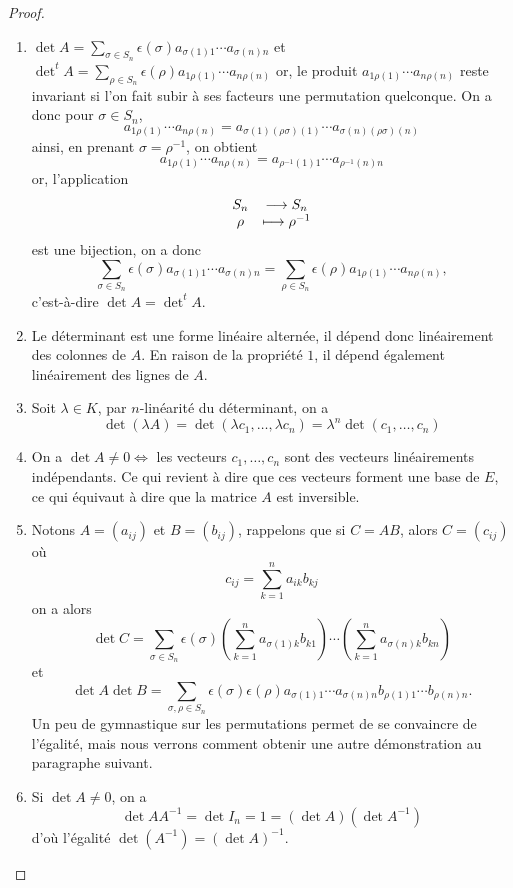 \documentclass[class=report,crop=false]{standalone}
\begin{document}
\begin{proof}
\begin{enumerate}
  \item $\det A=\sum_{\sigma\in S_n}\epsilon(\sigma)a_{\sigma(1)1}\cdots a_{\sigma(n)n}$ et 
$\det^t\!\!A=\sum_{\rho\in S_n}\epsilon(\rho)a_{1\rho(1)}\cdots a_{n\rho(n)}$
or, le produit $a_{1\rho(1)}\cdots a_{n\rho(n)}$ reste invariant si l'on fait subir à ses facteurs une
permutation quelconque. On a donc pour $\sigma\in S_n$, 
$$a_{1\rho(1)}\cdots a_{n\rho(n)}=a_{\sigma(1)(\rho\sigma)(1)}\cdots a_{\sigma(n)(\rho\sigma)(n)}$$
ainsi, en prenant $\sigma=\rho^{-1}$, on obtient
$$a_{1\rho(1)}\cdots a_{n\rho(n)}=a_{\rho^{-1}(1)1}\cdots a_{\rho^{-1}(n)n}$$
or, l'application
$$\begin{array}{cc}S_n&\longrightarrow S_n\cr \rho&\longmapsto \rho^{-1}\end{array}$$ 
est une bijection, on a donc
$$\sum_{\sigma\in S_n}\epsilon(\sigma)a_{\sigma(1)1}\cdots a_{\sigma(n)n}=
\sum_{\rho\in S_n}\epsilon(\rho)a_{1\rho(1)}\cdots a_{n\rho(n)},$$
c'est-à-dire
$\det A=\det^t\!\!A$.

  \item Le déterminant est une forme linéaire alternée, il dépend donc linéairement des colonnes de $A$. En raison de la propriété $1$, il dépend également linéairement des lignes de $A$.

  \item Soit $\lambda\in K$, par $n$-linéarité du déterminant, on a
$$\det(\lambda A)=\det(\lambda c_1,\dots,\lambda c_n)=\lambda^n\det(c_1,\dots,c_n)$$

  \item On a $\det A\neq 0\iff$ les vecteurs $c_1,\dots,c_n$ sont des vecteurs linéairements indépendants.
Ce qui revient à dire que ces vecteurs forment une base de $E$, ce qui équivaut à dire que la matrice $A$ est inversible.

  \item  Notons $A=(a_{ij})$ et $B=(b_{ij})$, rappelons que si $C=AB$, alors $C=(c_{ij})$ où
$$c_{ij}=\sum_{k=1}^na_{ik}b_{kj}$$
on a alors 
$$\det C=\sum_{\sigma\in S_n}\epsilon(\sigma)\left(\sum_{k=1}^n a_{\sigma(1)k}b_{k1}\right)
\cdots\left(\sum_{k=1}^n a_{\sigma(n)k}b_{kn}\right)$$ et 
$$\det A\det B=\sum_{\sigma,\rho\in S_n}\epsilon(\sigma)\epsilon(\rho)a_{\sigma(1)1}\cdots 
a_{\sigma(n)n}b_{\rho(1)1}\cdots b_{\rho(n)n}.$$
Un peu de gymnastique sur les permutations permet de se convaincre de l'égalité, mais nous verrons comment obtenir une autre démonstration au paragraphe suivant.

  \item Si $\det A\neq 0$, on a 
$$\det A A^{-1}=\det I_n=1=(\det A)(\det A^{-1})$$
d'où l'égalité $\det (A^{-1})=(\det A)^{-1}$. 
\end{enumerate}
\end{proof}
\end{document}
